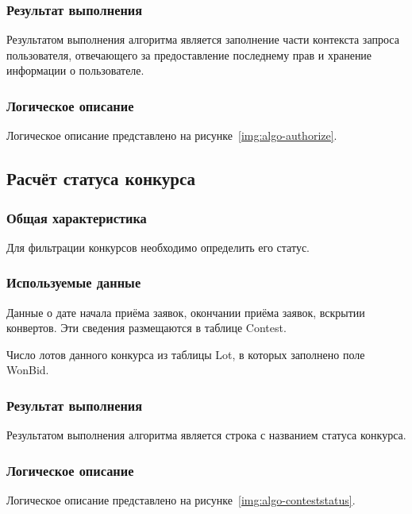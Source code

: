 \subsubsection*{Результат выполнения}

Результатом выполнения алгоритма является заполнение части контекста запроса пользователя, отвечающего за предоставление последнему прав и хранение информации о пользователе.

\subsubsection*{Логическое описание}

Логическое описание представлено на рисунке~\ref{img:algo-authorize}.
 

\subsection{Расчёт статуса конкурса}

\subsubsection*{Общая характеристика}

Для фильтрации конкурсов необходимо определить его статус.

\subsubsection*{Используемые данные}

Данные о дате начала приёма заявок, окончании приёма заявок, вскрытии конвертов. Эти сведения размещаются в таблице Contest.

Число лотов данного конкурса из таблицы Lot, в которых заполнено поле WonBid.

\subsubsection*{Результат выполнения}

Результатом выполнения алгоритма является строка с названием статуса конкурса.

\subsubsection*{Логическое описание}

Логическое описание представлено на рисунке~\ref{img:algo-conteststatus}.


\clearpage
\newpage